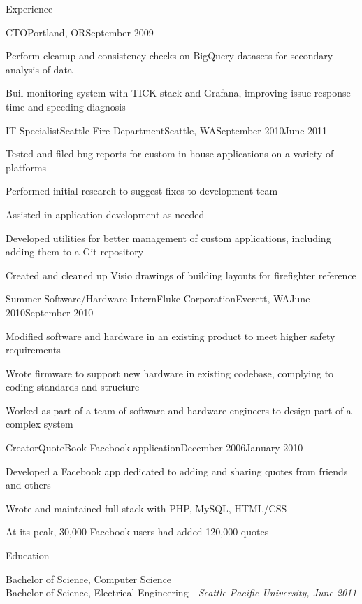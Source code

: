 \documentclass[letterpaper,10pt]{article}
\let\pt\pasttense
\let\anon\anonno
\begin{document}
\begin{res_section}{Experience}
\begin{res_experienceitem}{CTO}{\anon{SERPs.com}{SaaSCo}}{Portland, OR}{September 2009}{{\pt[Present]{March 2017}}}
  \item Perform\pt{ed} cleanup and consistency checks on BigQuery datasets for secondary analysis of data
  \item Buil\pt[d]{t} monitoring system with TICK stack and Grafana, improving issue response time and speeding diagnosis
\end{res_experienceitem}
\begin{res_experienceitem}{IT Specialist}{Seattle Fire Department}{Seattle, WA}{September 2010}{June 2011}
  \item Tested and filed bug reports for custom in-house applications on a variety of platforms
  \item Performed initial research to suggest fixes to development team
  \item Assisted in application development as needed
  \item Developed utilities for better management of custom applications, including adding them to a Git repository
  \item Created and cleaned up Visio drawings of building layouts for firefighter reference
\end{res_experienceitem}
\begin{res_experienceitem}{Summer Software/Hardware Intern}{Fluke Corporation}{Everett, WA}{June 2010}{September 2010}
  \item Modified software and hardware in an existing product to meet higher safety requirements
  \item Wrote firmware to support new hardware in existing codebase, complying to coding standards and structure
  \item Worked as part of a team of software and hardware engineers to design part of a complex system
\end{res_experienceitem}
\begin{res_experienceitem}{Creator}{QuoteBook Facebook application}{}{December 2006}{January 2010}
  \item Developed a Facebook app dedicated to adding and sharing quotes from friends and others
  \item Wrote and maintained full stack with PHP, MySQL, HTML/CSS
  \item At its peak, 30,000 Facebook users had added 120,000 quotes
\end{res_experienceitem}
\end{res_section}

\begin{res_section}{Education}
\begin{res_content}{Bachelor of Science, Computer Science\\
Bachelor of Science, Electrical Engineering - \em{Seattle Pacific University, June 2011}
}
\end{res_content}
\end{res_section}
\end{document}
